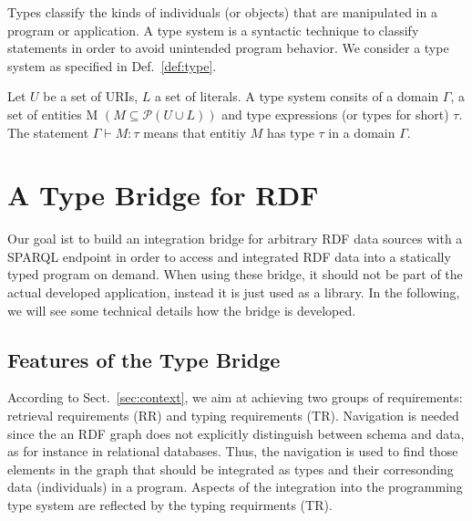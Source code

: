 \documentclass{llncs} %
\begin{document}

Types classify the kinds of individuals (or objects) that are manipulated in a program or application.
A type system is a syntactic technique to classify statements in order to avoid unintended program behavior.
We consider a type system as specified in Def.~\ref{def:type}. 

\begin{definition}
\label{def:type}
Let $U$ be a set of URIs, $L$  a set of literals.
A type system consits of a domain $\Gamma$,
a set of entities M $(M \subseteq \mathcal{P}(U \cup L))$ and type expressions (or types for short) $\tau$.
The statement $\Gamma \vdash M: \tau$ means that entitiy $M$ has type $\tau$ in a domain $\Gamma$.
\end{definition}




\section{A Type Bridge for RDF}  
\label{sec:design}



Our goal ist to build an integration bridge for arbitrary RDF data sources with a SPARQL endpoint
in order to access and integrated RDF data into a statically typed program on demand.
When using these bridge, it should not be part of the actual developed application,
instead it is just used as a library. In the following, we will see some technical details how
the bridge is developed.

\subsection{Features of the Type Bridge}
  
According to Sect.~\ref{sec:context}, we aim at achieving two groups of requirements:
retrieval requirements (RR) and typing requirements (TR). Navigation is needed since the an RDF graph does not explicitly 
distinguish between schema and data, as for instance in relational databases. Thus, the navigation is
used to find those elements in the graph that should be integrated as types and their corresonding data (individuals) in a program.
Aspects of the integration into the programming type system are reflected by the typing requirments (TR).
\end{document}
